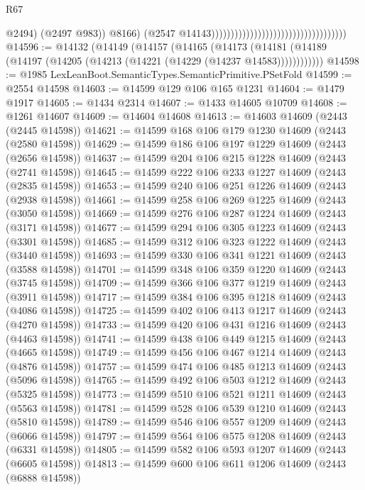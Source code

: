 \begin{lexlean}{R67}
\begin{coremodule}
                                                                              @2494)
                                                                            (@2497 @983))
                                                                          @8166)
                                                                        (@2547
                                                                          @14143)))))))))))))))))))))))))))))))))))
@14596 := @14132
    (@14149
      (@14157
        (@14165
          (@14173 (@14181 (@14189 (@14197 (@14205 (@14213 (@14221 (@14229 (@14237 @14583))))))))))))
@14598 := @1985 LexLeanBoot.SemanticTypes.SemanticPrimitive.PSetFold
@14599 := @2554 @14598
@14603 := @14599 @129 @106 @165 @1231
@14604 := @1479 @1917
@14605 := @1434 @2314
@14607 := @1433 @14605 @10709
@14608 := @1261 @14607
@14609 := @14604 @14608
@14613 := @14603 @14609 (@2443 (@2445 @14598))
@14621 := @14599 @168 @106 @179 @1230 @14609 (@2443 (@2580 @14598))
@14629 := @14599 @186 @106 @197 @1229 @14609 (@2443 (@2656 @14598))
@14637 := @14599 @204 @106 @215 @1228 @14609 (@2443 (@2741 @14598))
@14645 := @14599 @222 @106 @233 @1227 @14609 (@2443 (@2835 @14598))
@14653 := @14599 @240 @106 @251 @1226 @14609 (@2443 (@2938 @14598))
@14661 := @14599 @258 @106 @269 @1225 @14609 (@2443 (@3050 @14598))
@14669 := @14599 @276 @106 @287 @1224 @14609 (@2443 (@3171 @14598))
@14677 := @14599 @294 @106 @305 @1223 @14609 (@2443 (@3301 @14598))
@14685 := @14599 @312 @106 @323 @1222 @14609 (@2443 (@3440 @14598))
@14693 := @14599 @330 @106 @341 @1221 @14609 (@2443 (@3588 @14598))
@14701 := @14599 @348 @106 @359 @1220 @14609 (@2443 (@3745 @14598))
@14709 := @14599 @366 @106 @377 @1219 @14609 (@2443 (@3911 @14598))
@14717 := @14599 @384 @106 @395 @1218 @14609 (@2443 (@4086 @14598))
@14725 := @14599 @402 @106 @413 @1217 @14609 (@2443 (@4270 @14598))
@14733 := @14599 @420 @106 @431 @1216 @14609 (@2443 (@4463 @14598))
@14741 := @14599 @438 @106 @449 @1215 @14609 (@2443 (@4665 @14598))
@14749 := @14599 @456 @106 @467 @1214 @14609 (@2443 (@4876 @14598))
@14757 := @14599 @474 @106 @485 @1213 @14609 (@2443 (@5096 @14598))
@14765 := @14599 @492 @106 @503 @1212 @14609 (@2443 (@5325 @14598))
@14773 := @14599 @510 @106 @521 @1211 @14609 (@2443 (@5563 @14598))
@14781 := @14599 @528 @106 @539 @1210 @14609 (@2443 (@5810 @14598))
@14789 := @14599 @546 @106 @557 @1209 @14609 (@2443 (@6066 @14598))
@14797 := @14599 @564 @106 @575 @1208 @14609 (@2443 (@6331 @14598))
@14805 := @14599 @582 @106 @593 @1207 @14609 (@2443 (@6605 @14598))
@14813 := @14599 @600 @106 @611 @1206 @14609 (@2443 (@6888 @14598))

\end{coremodule}
\end{lexlean}
